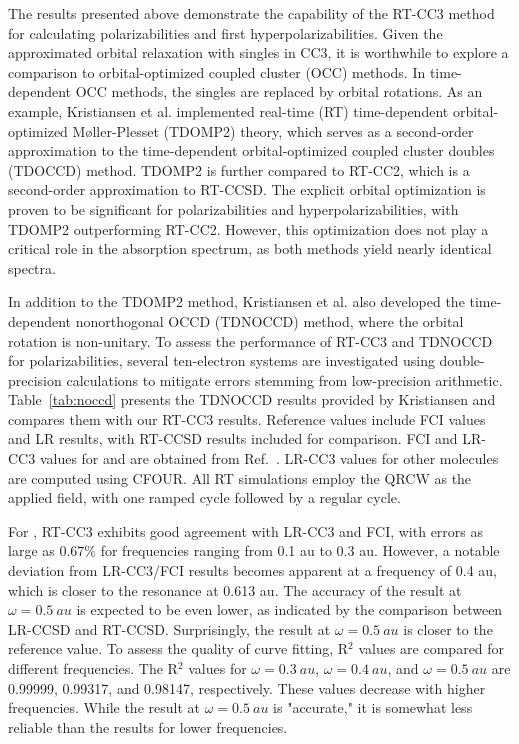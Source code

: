 The results presented above demonstrate the capability of the RT-CC3 method for calculating polarizabilities and first hyperpolarizabilities. Given the approximated orbital relaxation with singles in CC3, it is worthwhile to explore a comparison to orbital-optimized coupled cluster (OCC) methods. In time-dependent OCC methods, the singles are replaced by orbital rotations. As an example, Kristiansen et al. implemented real-time (RT) time-dependent orbital-optimized M\o{}ller-Plesset (TDOMP2) theory, which serves as a second-order approximation to the time-dependent orbital-optimized coupled cluster doubles (TDOCCD) method.\cite{Kristiansen2022} TDOMP2 is further compared to RT-CC2, which is a second-order approximation to RT-CCSD. The explicit orbital optimization is proven to be significant for polarizabilities and hyperpolarizabilities, with TDOMP2 outperforming RT-CC2. However, this optimization does not play a critical role in the absorption spectrum, as both methods yield nearly identical spectra.

In addition to the TDOMP2 method, Kristiansen et al. also developed the time-dependent nonorthogonal OCCD (TDNOCCD) method, where the orbital rotation is non-unitary. To assess the performance of RT-CC3 and TDNOCCD for polarizabilities, several ten-electron systems are investigated using double-precision calculations to mitigate errors stemming from low-precision arithmetic. Table~\ref{tab:noccd} presents the TDNOCCD results provided by Kristiansen and compares them with our RT-CC3 results. Reference values include FCI values and LR results, with RT-CCSD results included for comparison. FCI and LR-CC3 values for  and  are obtained from Ref.~. LR-CC3 values for other molecules are computed using CFOUR. All RT simulations employ the QRCW as the applied field, with one ramped cycle followed by a regular cycle.

For , RT-CC3 exhibits good agreement with LR-CC3 and FCI, with errors as large as $0.67\%$ for frequencies ranging from 0.1 au to 0.3 au. However, a notable deviation from LR-CC3/FCI results becomes apparent at a frequency of 0.4 au, which is closer to the resonance at 0.613 au. The accuracy of the result at $\omega=0.5\ au$ is expected to be even lower, as indicated by the comparison between LR-CCSD and RT-CCSD. Surprisingly, the result at $\omega=0.5\ au$ is closer to the reference value. To assess the quality of curve fitting, R$^{2}$ values are compared for different frequencies. The R$^{2}$ values for $\omega=0.3\ au$, $\omega=0.4\ au$, and $\omega=0.5\ au$ are 0.99999, 0.99317, and 0.98147, respectively. These values decrease with higher frequencies. While the result at $\omega=0.5\ au$ is "accurate," it is somewhat less reliable than the results for lower frequencies.

